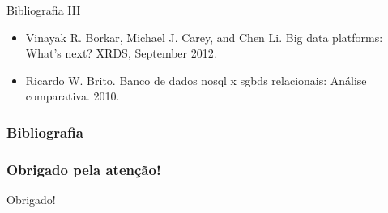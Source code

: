 \begin{frame}{Bibliografia III}
\begin{itemize}

\item Vinayak R. Borkar, Michael J. Carey, and Chen Li. Big data platforms: What's
next? XRDS, September 2012.

\item Ricardo W. Brito. Banco de dados nosql x sgbds relacionais: Análise comparativa.
2010.
\end{itemize}
\end{frame}

\begin{frame}\frametitle{Bibliografia}
  
  
\end{frame}

\appendix

\begin{frame}
  \frametitle{Obrigado pela atenção!}
  \begin{center}
    {\Huge Obrigado!}
  \end{center}
\end{frame}
